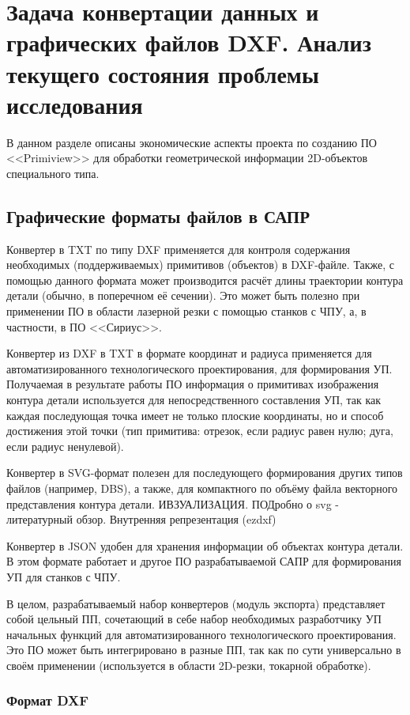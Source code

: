 \chapter{Задача конвертации данных и графических файлов DXF. Анализ текущего состояния проблемы исследования}
\label{cha:aktuell}

В данном разделе описаны экономические аспекты проекта по созданию ПО <<Primiview>> для обработки геометрической информации 2D-объектов специального типа.

\section{Графические форматы файлов в САПР}
Конвертер в TXT по типу DXF применяется для контроля содержания необходимых (поддерживаемых) примитивов (объектов) в DXF-файле. Также, с помощью данного формата может производится расчёт длины траектории  контура детали (обычно, в поперечном её сечении). Это может быть полезно при применении ПО в области лазерной резки с помощью станков с ЧПУ, а, в частности, в ПО <<Сириус>>.

Конвертер из DXF в TXT в формате координат и радиуса применяется для автоматизированного технологического проектирования, для формирования УП. Получаемая в результате работы ПО информация о примитивах изображения контура детали используется для непосредственного составления УП, так как каждая последующая точка имеет не только плоские координаты, но и способ достижения этой точки (тип примитива: отрезок, если радиус равен нулю; дуга, если радиус ненулевой).

Конвертер в SVG-формат полезен для последующего формирования других типов файлов (например, DBS), а также, для компактного по объёму файла векторного представления контура детали. ИВЗУАЛИЗАЦИЯ. ПОДробно о svg - литературный обзор. Внутренняя репрезентация (ezdxf)

Конвертер в JSON удобен для хранения информации об объектах контура детали. В этом формате работает и другое ПО разрабатываемой САПР для формирования УП для станков с ЧПУ.

В целом, разрабатываемый набор конвертеров (модуль экспорта) представляет собой цельный ПП, сочетающий в себе набор необходимых разработчику УП начальных функций для автоматизированного технологического проектирования. Это ПО может быть интегрировано в разные ПП, так как по сути универсально в своём применении (используется в области 2D-резки, токарной обработке).


\subsection{Формат DXF}

